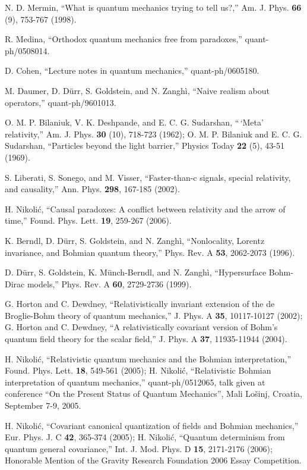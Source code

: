 \documentclass[12pt]{article}
\begin{document}
\begin{thebibliography}{99}
N. D. Mermin,
``What is quantum mechanics trying to tell us?,''
Am. J. Phys. {\bf 66} (9), 753-767 (1998).

R. Medina,
``Orthodox quantum mechanics free from paradoxes,''
quant-ph/0508014.

D. Cohen,
``Lecture notes in quantum mechanics,''
quant-ph/0605180.

M. Daumer, D. D\"urr, S. Goldstein, and N. Zangh\`i, 
``Naive realism about operators,''
quant-ph/9601013.

O. M. P. Bilaniuk, V. K. Deshpande, and E. C. G. Sudarshan,
``\,`Meta' relativity,''
Am. J. Phys. {\bf 30} (10), 718-723 (1962);
%
O. M. P. Bilaniuk and E. C. G. Sudarshan,
``Particles beyond the light barrier,''
Physics Today {\bf 22} (5), 43-51 (1969).

S. Liberati, S. Sonego, and M. Visser,
``Faster-than-c signals, special relativity, and causality,''
Ann. Phys. {\bf 298}, 167-185 (2002).

H. Nikoli\'c,
``Causal paradoxes: A conflict between relativity and the arrow of time,''
Found. Phys. Lett. {\bf 19}, 259-267 (2006).

K. Berndl, D. D\"urr, S. Goldstein, and N. Zangh\`i,
``Nonlocality, Lorentz invariance, and Bohmian quantum theory,''
Phys. Rev. A {\bf 53}, 2062-2073 (1996).

D. D\"urr, S. Goldstein, K. M\"unch-Berndl, and N. Zangh\`i,
``Hypersurface Bohm-Dirac models,''
Phys. Rev. A {\bf 60}, 2729-2736 (1999).

G. Horton and C. Dewdney, 
``Relativistically invariant extension of the de Broglie-Bohm theory of
quantum mechanics,''
J. Phys. A {\bf 35}, 10117-10127 (2002);
G. Horton and C. Dewdney,
``A relativistically covariant version of Bohm's quantum field theory for
the scalar field,''
J. Phys. A {\bf 37}, 11935-11944 (2004).

H. Nikoli\'c, 
``Relativistic quantum mechanics and the Bohmian interpretation,''
Found. Phys. Lett. {\bf 18}, 549-561 (2005);
H. Nikoli\'c, 
``Relativistic Bohmian interpretation of quantum mechanics,'' 
quant-ph/0512065,
talk given at conference ``On the Present Status of Quantum Mechanics'', Mali
Lo\v{s}inj, Croatia, September 7-9, 2005.

H. Nikoli\'c,
``Covariant canonical quantization of fields and Bohmian mechanics,''
Eur. Phys. J. C {\bf 42}, 365-374 (2005);
H. Nikoli\'c,
``Quantum determinism from quantum general covariance,''
Int. J. Mod. Phys. D {\bf 15}, 2171-2176 (2006);
Honorable Mention of the Gravity Research Foundation 2006 Essay Competition.


\end{thebibliography}
\end{document}
